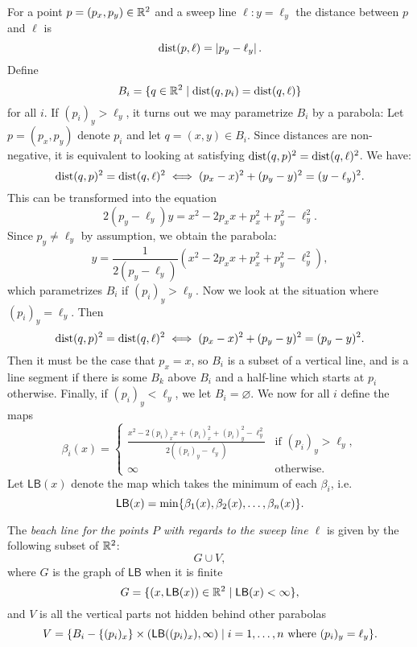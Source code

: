 For a point $p = (p_x, p_y) \in \mathbb{R}^2$ and a sweep line $\ell \colon y = \ell_y$ the distance between $p$ and $\ell$ is
\[
    \operatorname{dist}(p, \ell) = \left\lvert p_y - \ell_y \right\rvert.
\]
Define
\[
    B_i = \{q \in \mathbb{R}^2 \mid \operatorname{dist}(q, p_i) = \operatorname{dist}(q, \ell)\}
\]
for all $i$. If $(p_i)_y > \ell_y$, it turns out we may parametrize $B_i$ by a parabola: Let $p = (p_x, p_y)$ denote $p_i$ and let $q = (x, y) \in B_i$. Since distances are non-negative, it is equivalent to looking at satisfying $\operatorname{dist}(q, p)^2 = \operatorname{dist}(q, \ell)^2$. We have:
\[
    \operatorname{dist}(q, p)^2 = \operatorname{dist}(q, \ell)^2 \iff (p_x - x)^2 + (p_y - y)^2 = (y - \ell_y)^2.
\]
This can be transformed into the equation
\begin{equation}
    2 (p_y - \ell_y) y = x^2 - 2 p_x x + p_x^2 + p_y^2 - \ell_y^2.
\end{equation}
Since $p_y \ne \ell_y$ by assumption, we obtain the parabola:
\begin{equation} \label{eq:parabola}
    y = \frac{1}{2 (p_y - \ell_y)} (x^2 - 2 p_x x + p_x^2 + p_y^2 - \ell_y^2),
\end{equation}
which parametrizes $B_i$ if $(p_i)_y > \ell_y$. Now we look at the situation where $(p_i)_y = \ell_y$. Then
\[
    \operatorname{dist}(q, p)^2 = \operatorname{dist}(q, \ell)^2 \iff (p_x - x)^2 + (p_y - y)^2 = (p_y - y)^2.
\]
Then it must be the case that $p_x = x$, so $B_i$ is a subset of a vertical line, and is a line segment if there is some $B_k$ above $B_i$ and a half-line which starts at $p_i$ otherwise. Finally, if $(p_i)_y < \ell_y$, we let $B_i = \varnothing$. We now for all $i$ define the maps
\[
    \beta_i(x) = \begin{cases}
        \displaystyle \frac{x^2 - 2 (p_i)_x x + (p_i)_x^2 + (p_i)_y^2 - \ell_y^2}{2 ((p_i)_y - \ell_y)} & \text{if } (p_i)_y > \ell_y, \\
        \infty & \text{otherwise.}
    \end{cases}
\]
Let $\textsf{LB}(x)$ denote the map which takes the minimum of each $\beta_i$, i.e.
\[
    \textsf{LB}(x) = \min\{\beta_1(x), \beta_2(x), \ldots, \beta_n(x)\}.
\]
\begin{defn}
The \emph{beach line for the points $P$ with regards to the sweep line $\ell$} is given by the following subset of $\mathbb{R}^2$:
\[
    G \cup V,
\]
where $G$ is the graph of $\textsf{LB}$ when it is finite
\[
    G = \{(x, \textsf{LB}(x)) \in \mathbb{R}^2 \mid \textsf{LB}(x) < \infty\},
\]
and $V$ is all the vertical parts not hidden behind other parabolas
\[
    V = \{B_i - \{(p_i)_x\} \times (\textsf{LB}((p_i)_x), \infty) \mid i = 1, \ldots, n \text{ where } (p_i)_y = \ell_y\}.
\]
\end{defn}
